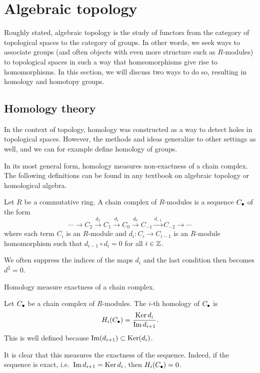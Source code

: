\section*{Algebraic topology}

Roughly stated, algebraic topology is the study of functors from the category of topological spaces to the category of groups.
In other words, we seek ways to associate groups (and often objects with even more structure such as $R$-modules) to topological spaces in such a way that homeomorphisms give rise to homomorphisms.
In this section, we will discuss two ways to do so, resulting in homology and homotopy groups.

\subsection*{Homology theory}

In the context of topology, homology was constructed as a way to detect holes in topological spaces.
However, the methods and ideas generalize to other settings as well, and we can for example define homology of groups.

In its most general form, homology measures non-exactness of a chain complex.
The following definitions can be found in any textbook on algebraic topology or homological algebra.

\begin{definition}
    Let $R$ be a commutative ring.
    A chain complex of $R$-modules is a sequence $C_\bullet$ of the form
    \[
    \cdots \to  C_2 \xrightarrow{d_2}  C_1 \xrightarrow{d_1} C_0 \xrightarrow{d_0} C_{-1} \xrightarrow{d_{-1}}   C_{-2} \to  \cdots
    \] 
    where each term $C_i$ is an $R$-module and $d_i: C_i \to  C_{i-1}$ is an $R$-module homomorphism such that $d_{i-1}  \circ  d_i = 0$  for all $i \in \mathbb{Z}$.
\end{definition}
We often suppress the indices of the maps $d_i$ and the last condition then becomes $d^2 = 0$.

\begin{marginfigure}
    \centering
    \caption{Homology measure exactness of a chain complex.}
    \label{fig:homology-definition}
\end{marginfigure}

\begin{definition}[Homology]
    Let $C_\bullet$ be a chain complex of  $R$-modules. The $i$-th homology of $C_\bullet$ is
     \[
         H_i(C_\bullet) = \frac{\operatorname{Ker} d_i}{\operatorname{Im} d_{i+1}}
    .\] 
    This is well defined because $\operatorname{Im}(d_{i+1}) \subset \operatorname{Ker} (d_i)$.
\end{definition}
It is clear that this measures the exactness of the sequence. Indeed, if the sequence is exact, i.e.\ $\operatorname{Im} d_{i+1} = \operatorname{Ker} d_i$, then $H_i(C_\bullet) = 0$.


